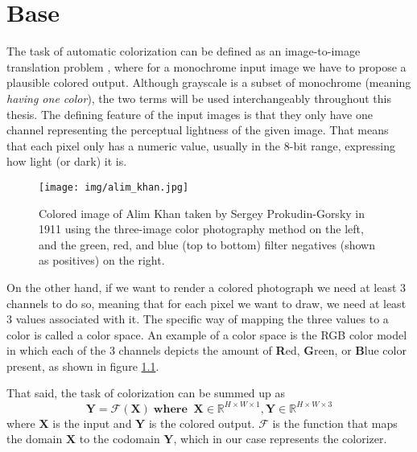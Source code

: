 \begin{comment}
    Use cases
    Multimodality

    Neural networks:
        Basics
        CNN
        U-NET

    Dataset

    Implementations:
        Colorful image colorization
        GAN/pix2pix
        IDeep
\end{comment}

\chapter{Base}
\label{ch:base}

The task of automatic colorization can be defined as an image-to-image 
translation problem \citep{pang2021imagetoimage}, where for a monochrome 
input image we have to propose a plausible colored output. Although 
grayscale is a subset of monochrome (meaning \textit{having one color}), 
the two terms will be used interchangeably throughout this thesis. 
The defining feature of the input images is that they only have one channel 
representing the perceptual lightness of the given image. That means that 
each pixel only has a numeric value, usually in the 8-bit range, 
expressing how light (or dark) it is. 

\begin{figure}[H]
    \centering
    \texttt{[image: img/alim\_khan.jpg]}
    \caption{
    Colored image of Alim Khan taken by Sergey Prokudin-Gorsky 
    in 1911 using the three-image color photography method on the left,
    and the green, red, and blue (top to bottom) filter negatives
    (shown as positives) on the right.}
    \label{fig:alim_khan}
\end{figure}

On the other hand, if we want to render a colored photograph we need at 
least 3 channels to do so, meaning that for each pixel we want to draw, 
we need at least 3 values associated with it. The specific way of mapping 
the three values to a color is called a color space. An example of a color
space is the RGB color model in which each of the 3 channels depicts the 
amount of \textbf{R}ed, \textbf{G}reen, or \textbf{B}lue color present,
as shown in figure \ref{fig:alim_khan}. 

That said, the task of colorization can be summed up as
\begin{equation}
    \mathbf{Y} = \mathcal{F}(\mathbf{X})\;\mathbf{where}\;\;\mathbf{X} \in \mathbb{R}^{H \times W \times 1}, \mathbf{Y} \in \mathbb{R}^{H \times W \times 3}\label{eq:colorization}
\end{equation}    
where $\mathbf{X}$ is the input 
and $\mathbf{Y}$ is the colored output.
$\mathcal{F}$ is the function that maps the domain $\mathbf{X}$ to the codomain 
$\mathbf{Y}$, which in our case represents the colorizer.

